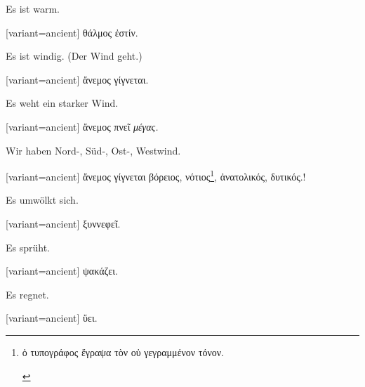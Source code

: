 Es ist warm.

\switchcolumn

\begin{greek}[variant=ancient]%
θάλμος ἐστίν.

\end{greek}%
\switchcolumn*

Es ist windig. (Der Wind geht.)

\switchcolumn

\begin{greek}[variant=ancient]%
ἄνεμος γίγνεται.

\end{greek}%
\switchcolumn*

Es weht ein starker Wind.

\switchcolumn

\begin{greek}[variant=ancient]%
ἄνεμος πνεῖ \emph{μέγας.}

\end{greek}%
\switchcolumn*

Wir haben Nord-, Süd-, Ost-, Westwind.

\switchcolumn

\begin{greek}[variant=ancient]%
ἄνεμος γίγνεται βόρειος, νότιος\footnote{\begin{latin}%
\textgreek[variant=ancient]{ὁ τυπογράφος ἔγραψα τὸν οὐ γεγραμμένον
τόνον.}\end{latin}%
}, ἀνατολικός, δυτικός.!

\end{greek}%
\switchcolumn*

Es umwölkt sich.

\switchcolumn

\begin{greek}[variant=ancient]%
ξυννεφεῖ.

\end{greek}%
\switchcolumn*

Es sprüht.

\switchcolumn

\begin{greek}[variant=ancient]%
ψακάζει.

\end{greek}%
\switchcolumn*

Es regnet.

\switchcolumn

\begin{greek}[variant=ancient]%
ὕει.

\end{greek}%
\switchcolumn*

